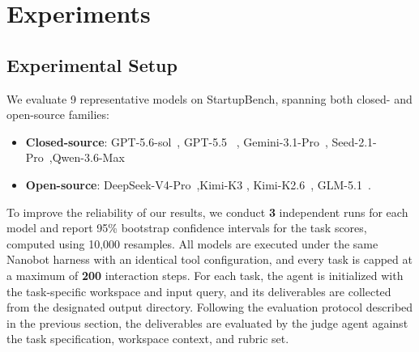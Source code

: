 
\section{Experiments}
\label{sec:experiments}

\subsection{Experimental Setup}

\label{sec:exp-setup}



We evaluate 9 representative models on StartupBench, spanning both closed- and open-source families:
\begin{itemize}
    \item  \textbf{Closed-source}:  GPT-5.6-sol~\cite{openai2026gpt56}, GPT-5.5 ~\cite{openai_gpt55}, Gemini-3.1-Pro~\cite{GoogleCloud2026Gemini3.1Pro}, Seed-2.1-Pro~\cite{bytedance2026seed21},Qwen-3.6-Max~\cite{qwen36_max_preview}

    \item \textbf{Open-source}: DeepSeek-V4-Pro~\cite{deepseek2026v4},Kimi-K3 \cite{team2026kimi}, Kimi-K2.6~\cite{moonshot2026k2_6},  GLM-5.1~\cite{zeng2026glm}.
\end{itemize}
To improve the reliability of our results, we conduct \textbf{3} independent runs for each model and report 95\% bootstrap confidence intervals for the task scores, computed using 10{,}000 resamples.
All models are executed under the same Nanobot harness with an identical tool configuration, and every task is capped at a maximum of \textbf{200} interaction steps.
For each task, the agent is initialized with the task-specific workspace and input query, and its deliverables are collected from the designated output directory. Following the evaluation protocol described in the previous section, the deliverables are evaluated by the judge agent against the task specification, workspace context, and rubric set.

